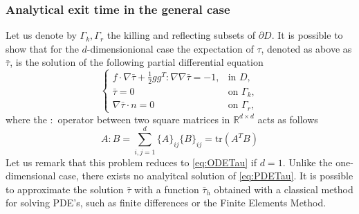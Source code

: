 \subsubsection{Analytical exit time in the general case}
Let us denote by $\Gamma_k,\Gamma_r$ the killing and reflecting subsets of $\partial D$. It is possible to show that for the $d$-dimensionional case the expectation of $\tau$, denoted as above as $\bar\tau$, is the solution of the following partial differential equation \cite{Krumscheid2015,Pavliotis2014}
\begin{equation}\label{eq:PDETau}
\begin{cases}
	f \cdot \nabla \bar\tau + \frac{1}{2} gg^T : \nabla \nabla \bar\tau = -1, & \text{in } D, \\
	\bar\tau = 0 & \text{on } \Gamma_k, \\
	\nabla \bar\tau \cdot n = 0 & \text{on } \Gamma_r,
\end{cases}
\end{equation}
where the $:$ operator between two square matrices in $\mathbb{R}^{d\times d}$ acts as follows
\begin{equation}\label{eq:twoPoints}
	A : B = \sum_{i,j = 1}^d \{A\}_{ij}\{B\}_{ij} = \text{tr}(A^TB)
\end{equation}
Let us remark that this problem reduces to \eqref{eq:ODETau} if $d=1$. Unlike the one-dimensional case, there exists no analyitcal solution of \eqref{eq:PDETau}. It is possible to approximate the solution $\bar\tau$ with a function $\bar\tau_h$ obtained with a classical method for solving PDE's, such as finite differences or the Finite Elements Method.

